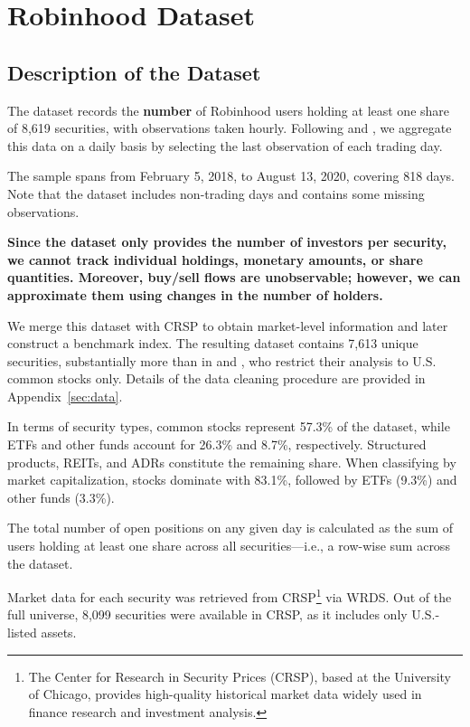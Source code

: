 \section{Robinhood Dataset}
\subsection{Description of the Dataset}
The dataset records the \textbf{number} of Robinhood users holding at least one share of 8,619 securities, with observations taken hourly. 
Following \cite{Welch2022} and \cite{Fedyk2024}, we aggregate this data on a daily basis by selecting the last observation of each trading day.

The sample spans from February 5, 2018, to August 13, 2020, covering 818 days. Note that the dataset includes non-trading days and contains some missing observations.

\textbf{
    Since the dataset only provides the number of investors per security, we cannot track individual holdings, monetary amounts, or share quantities. 
    Moreover, buy/sell flows are unobservable; however, we can approximate them using changes in the number of holders.
}

We merge this dataset with CRSP to obtain market-level information and later construct a benchmark index. 
The resulting dataset contains 7,613 unique securities, substantially more than in \cite{Fedyk2024} and \cite{Welch2022}, who restrict their analysis to U.S. common stocks only. 
Details of the data cleaning procedure are provided in Appendix~\ref{sec:data}.

In terms of security types, common stocks represent 57.3\% of the dataset, while ETFs and other funds account for 26.3\% and 8.7\%, respectively. 
Structured products, REITs, and ADRs constitute the remaining share. 
When classifying by market capitalization, stocks dominate with 83.1\%, followed by ETFs (9.3\%) and other funds (3.3\%).

The total number of open positions on any given day is calculated as the sum of users holding at least one share across all securities—i.e., a row-wise sum across the dataset.

Market data for each security was retrieved from CRSP\footnote{The Center for Research in Security Prices (CRSP), based at the University of Chicago, provides high-quality historical market data widely used in finance research and investment analysis.} via WRDS. 
Out of the full universe, 8,099 securities were available in CRSP, as it includes only U.S.-listed assets. 


